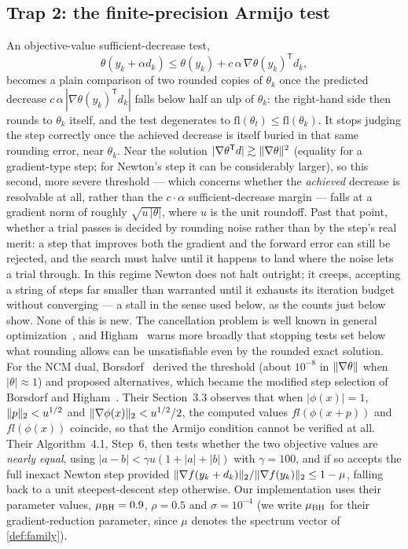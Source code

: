 \subsection{Trap 2: the finite-precision Armijo test}\label{sec:trap2}
An objective-value sufficient-decrease test,
\begin{equation}\label{eq:armijo}
  \theta(y_k+\alpha d_k)\le\theta(y_k)+c\,\alpha\,\nabla\theta(y_k)^{\mathsf T}d_k,
\end{equation}
becomes a plain comparison of two rounded copies of $\theta_k$ once the
predicted decrease $c\,\alpha\,|\nabla\theta(y_k)^{\mathsf T}d_k|$ falls
below half an ulp of $\theta_k$: the right-hand side then rounds to
$\theta_k$ itself, and the test degenerates to $\mathrm{fl}(\theta_t)\le
\mathrm{fl}(\theta_k)$. It stops judging the step correctly once the
achieved decrease is itself buried in that same rounding error, near
$\theta_k$. Near the solution
$|\nabla\theta^{\mathsf T}d|\gtrsim\lVert \nabla\theta\rVert^2$ (equality for a
gradient-type step; for Newton's step it can be considerably larger), so
this second, more severe threshold --- which concerns whether the
\emph{achieved} decrease is resolvable at all, rather than the
$c\cdot\alpha$ sufficient-decrease margin --- falls at a gradient norm of roughly
$\sqrt{u\,|\theta|}$, where $u$ is the unit roundoff. Past that point,
whether a trial passes is decided by rounding noise rather than by the
step's real merit: a step that
improves both the gradient and the forward error can still be rejected, and
the search must halve until it happens to land where the noise lets a
trial through. In this regime Newton does not halt outright; it creeps,
accepting a string of steps far smaller than warranted until it exhausts its
iteration budget without converging --- a stall in the sense used below, as
the counts just below show. None of this is new. The
cancellation problem is well known in general
optimization~\cite{hager2005new}, and Higham~\cite[Ch.~17]{higham2002accuracy}
warns more broadly that stopping tests set below what rounding allows can be
unsatisfiable even by the rounded exact solution. For the NCM dual,
Borsdorf~\cite[\S4.7.1]{borsdorf2007newton} derived the threshold (about
$10^{-8}$ in $\lVert \nabla\theta\rVert$ when $|\theta|\approx1$) and proposed
alternatives, which became the
modified step selection of Borsdorf and Higham~\cite[Sec.~3.3,
Alg.~4.1]{borsdorf2010preconditioned}. Their Section~3.3 observes that when
$|\phi(x)|=1$, $\lVert p\rVert_2<u^{1/2}$ and $\lVert \nabla\phi(x)\rVert_2<u^{1/2}/2$, the
computed values $fl(\phi(x+p))$ and $fl(\phi(x))$ coincide, so that the Armijo
condition cannot be verified at all. Their Algorithm~4.1, Step~6, then tests
whether the two objective values are \emph{nearly equal}, using
$|a-b|<\gamma u(1+|a|+|b|)$ with $\gamma=100$, and if so accepts the full
inexact Newton step provided
$\lVert \nabla f(y_k+d_k)\rVert_2/\lVert \nabla f(y_k)\rVert_2\le1-\mu$, falling
back to a unit steepest-descent step otherwise. Our implementation uses their
parameter values, $\mu_{\mathrm{BH}}=0.9$, $\rho=0.5$ and $\sigma=10^{-4}$ (we write
$\mu_{\mathrm{BH}}$ for their gradient-reduction parameter, since $\mu$ denotes the
spectrum vector of \cref{def:family}).

